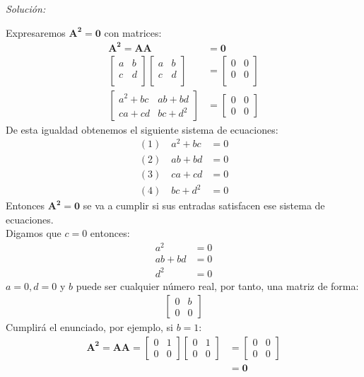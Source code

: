 \documentclass[12pt]{article}
\newenvironment{sol}
    {\emph{Solución:}
    }
    {
    }
\begin{document}
\begin{sol}
Expresaremos $\mathbf{A^2}=\mathbf{0}$ con matrices:
\begin{align*}
\mathbf{A^2}=\mathbf{AA} &= \mathbf{0} \\
\begin{bmatrix}
a & b \\
c & d \\
\end{bmatrix}
\begin{bmatrix}
a & b \\
c & d \\
\end{bmatrix}
&=
\begin{bmatrix}
0 & 0 \\
0 & 0 \\
\end{bmatrix}\\
\begin{bmatrix}
a^2+bc & ab+bd \\
ca+cd & bc + d^2
\end{bmatrix}
&= 
\begin{bmatrix}
0 & 0 \\
0 & 0
\end{bmatrix}
\end{align*}
De esta igualdad obtenemos el siguiente sistema de ecuaciones:
\begin{align*}
(1) \quad a^2+bc &=0 \\
(2) \quad ab+bd &= 0\\
(3) \quad ca+cd &= 0\\
(4) \quad bc + d^2 &= 0
\end{align*}
Entonces $\mathbf{A^2}=\mathbf{0}$ se va a cumplir si sus entradas satisfacen ese sistema de ecuaciones.\\
Digamos que $c=0$ entonces:
\begin{align*}
a^2 &=0 \\
ab+bd &= 0\\
d^2 &= 0
\end{align*}
$a=0 , d=0 $ y $b$ puede ser cualquier número real, por tanto, una matriz de forma:
\begin{align*}
\begin{bmatrix}
0 & b \\
0 & 0
\end{bmatrix}
\end{align*}
Cumplirá el enunciado, por ejemplo, si $b=1$:
\begin{align*}
\mathbf{A^2}=\mathbf{AA}=
\begin{bmatrix}
0 & 1 \\
0 & 0
\end{bmatrix}
\begin{bmatrix}
0 & 1 \\
0 & 0
\end{bmatrix}
&=\begin{bmatrix}
0 & 0 \\
0 & 0
\end{bmatrix}
\\
&= \mathbf{0}
\end{align*}

\end{sol}
\end{document}
